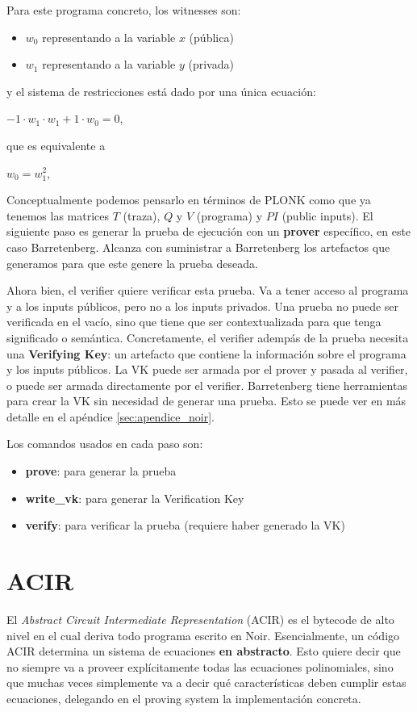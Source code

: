 Para este programa concreto, los witnesses son:
\begin{itemize}
	\item $w_0$ representando a la variable $x$ (pública)
	\item $w_1$ representando a la variable $y$ (privada)
\end{itemize}
y el sistema de restricciones está dado por una única ecuación:
\begin{center}
	$-1 \cdot w_1 \cdot w_1 + 1 \cdot w_0 = 0$, 
\end{center}
que es equivalente a 
\begin{center}
	$w_0 = w_1^2$,
\end{center}

Conceptualmente podemos pensarlo en términos de PLONK como que ya tenemos las matrices $T$ (traza), $Q$ y $V$ (programa) y $PI$ (public inputs). El siguiente paso es generar la prueba de ejecución con un \textbf{prover} específico, en este caso Barretenberg. Alcanza con suministrar a Barretenberg los artefactos que generamos para que este genere la prueba deseada.

Ahora bien, el verifier quiere verificar esta prueba. Va a tener acceso al programa y a los inputs públicos, pero no a los inputs privados. Una prueba no puede ser verificada en el vacío, sino que tiene que ser contextualizada para que tenga significado o semántica. Concretamente, el verifier adempás de la prueba necesita una \textbf{Verifying Key}: un artefacto que contiene la información sobre el programa y los inputs públicos. La VK puede ser armada por el prover y pasada al verifier, o puede ser armada directamente por el verifier. Barretenberg tiene herramientas para crear la VK sin necesidad de generar una prueba. Esto se puede ver en más detalle en el apéndice \ref{sec:apendice_noir}. 

Los comandos usados en cada paso son:
\begin{itemize}
	\item \textbf{prove}: para generar la prueba
	\item \textbf{write\_vk}: para generar la Verification Key
	\item \textbf{verify}: para verificar la prueba (requiere haber generado la VK)
\end{itemize}

\section{ACIR}\label{sec:acir}
El \textit{Abstract Circuit Intermediate Representation} (ACIR) es el bytecode de alto nivel en el cual deriva todo programa escrito en Noir. Esencialmente, un código ACIR determina un sistema de ecuaciones \textbf{en abstracto}. Esto quiere decir que no siempre va a proveer explícitamente todas las ecuaciones polinomiales, sino que muchas veces simplemente va a decir qué características deben cumplir estas ecuaciones, delegando en el proving system la implementación concreta. 

